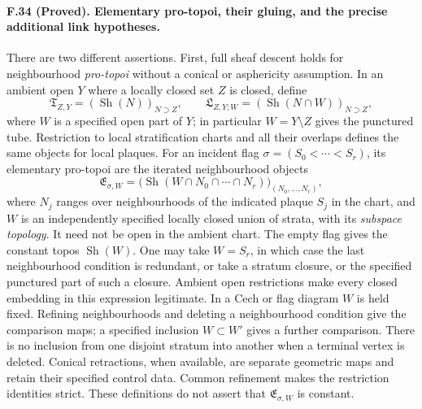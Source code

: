 \paragraph{F.34 (Proved). Elementary pro-topoi, their gluing, and the
precise additional link hypotheses.}
There are two different assertions.
First, full sheaf descent holds for neighbourhood \emph{pro-topoi}
without a conical or asphericity assumption. In an ambient open $Y$
where a locally closed set $Z$ is closed, define
\[
 \mathfrak T_{Z,Y}=(\operatorname{Sh}(N))_{N\supset Z},
 \qquad
 \mathfrak L_{Z,Y;W}=(\operatorname{Sh}(N\cap W))_{N\supset Z},
 \tag{F.h.4}
\]
where $W$ is a specified open part of $Y$; in particular
$W=Y\setminus Z$ gives the punctured tube. Restriction to local
stratification charts and all their overlaps defines the same objects
for local plaques. For an incident flag
$\sigma=(S_0<\cdots<S_r)$, its elementary pro-topoi are the iterated
neighbourhood objects
\[
 \mathfrak E_{\sigma,W}
   =\bigl(\operatorname{Sh}
       (W\cap N_0\cap\cdots\cap N_r)\bigr)_{(N_0,\ldots,N_r)},
 \tag{F.h.5}
\]
where $N_j$ ranges over neighbourhoods of the indicated plaque $S_j$
in the chart, and $W$ is an independently specified locally closed
union of strata, with its \emph{subspace topology}. It need not be
open in the ambient chart. The empty flag gives the constant topos
$\operatorname{Sh}(W)$. One may take $W=S_r$, in which case the last
neighbourhood condition is redundant, or take a stratum closure, or
the specified punctured part of such a closure. Ambient open
restrictions make every closed embedding in this expression legitimate.
In a Cech or flag diagram $W$ is held fixed. Refining neighbourhoods
and deleting a neighbourhood condition give the comparison maps;
a specified inclusion $W\subset W'$ gives a further comparison.
There is no inclusion from one disjoint stratum into another when a
terminal vertex is deleted. Conical retractions, when available, are
separate geometric maps and retain their specified control data.
Common refinement makes the restriction identities strict. These
definitions do not assert that
$\mathfrak E_{\sigma,W}$ is constant.


